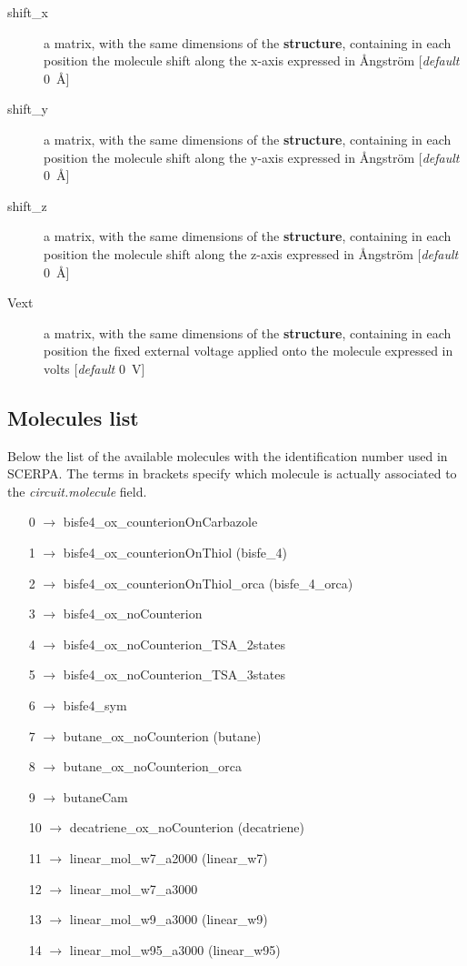 \documentclass[a4paper,10pt]{article}
\begin{document}
\begin{description}
\item[shift\_x] a matrix, with the same dimensions of the \textbf{structure}, containing in each position the molecule shift along the x-axis expressed in \r{A}ngstr\"{o}m [\textit{default} 0~\AA]
\item[shift\_y] a matrix, with the same dimensions of the \textbf{structure}, containing in each position the molecule shift along the y-axis expressed in \r{A}ngstr\"{o}m [\textit{default} 0~\AA]
\item[shift\_z] a matrix, with the same dimensions of the \textbf{structure}, containing in each position the molecule shift along the z-axis expressed in \r{A}ngstr\"{o}m [\textit{default} 0~\AA]
\item[Vext] a matrix, with the same dimensions of the \textbf{structure}, containing in each position the fixed external voltage applied onto the molecule expressed in volts [\textit{default} 0~V]
\end{description}



\subsection*{Molecules list}
\noindent Below the list of the available molecules with the identification number used in SCERPA. The terms in brackets specify which molecule is actually associated to the \textit{circuit.molecule} field. 
\begin{itemize}
\item[0 ] $\longrightarrow$  bisfe4\_ox\_counterionOnCarbazole
\item[1 ] $\longrightarrow$  bisfe4\_ox\_counterionOnThiol (bisfe\_4)
\item[2 ] $\longrightarrow$  bisfe4\_ox\_counterionOnThiol\_orca (bisfe\_4\_orca)
\item[3 ] $\longrightarrow$  bisfe4\_ox\_noCounterion
\item[4 ] $\longrightarrow$  bisfe4\_ox\_noCounterion\_TSA\_2states
\item[5 ] $\longrightarrow$  bisfe4\_ox\_noCounterion\_TSA\_3states
\item[6 ] $\longrightarrow$  bisfe4\_sym
\item[7 ] $\longrightarrow$  butane\_ox\_noCounterion (butane)
\item[8 ] $\longrightarrow$  butane\_ox\_noCounterion\_orca
\item[9 ] $\longrightarrow$  butaneCam
\item[10] $\longrightarrow$  decatriene\_ox\_noCounterion (decatriene)
\item[11] $\longrightarrow$  linear\_mol\_w7\_a2000 (linear\_w7)
\item[12] $\longrightarrow$  linear\_mol\_w7\_a3000
\item[13] $\longrightarrow$  linear\_mol\_w9\_a3000 (linear\_w9)
\item[14] $\longrightarrow$  linear\_mol\_w95\_a3000 (linear\_w95)
\end{itemize}
\end{document}
